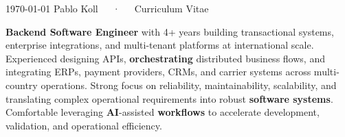 \documentclass[11pt, a4paper]{awesome-cv}
\begin{document}
\makecvheader
\makecvfooter
  {\today}
  {Pablo Koll~~~·~~~Curriculum Vitae}
  {\thepage}

\vspace{5mm}
\begin{cvparagraph}
\textbf{Backend Software Engineer} with 4+ years building transactional systems, enterprise integrations, and multi-tenant platforms at international scale. Experienced designing APIs, \textbf{orchestrating} distributed business flows, and integrating ERPs, payment providers, CRMs, and carrier systems across multi-country operations. Strong focus on reliability, maintainability, scalability, and translating complex operational requirements into robust \textbf{software systems}. Comfortable leveraging \textbf{AI}-assisted \textbf{workflows} to accelerate development, validation, and operational efficiency.
\end{cvparagraph}
\vspace{1mm}


\vspace{3mm}

\vspace{3mm}

\vspace{3mm}

% 
% 
% 
% 
% 


\end{document}
